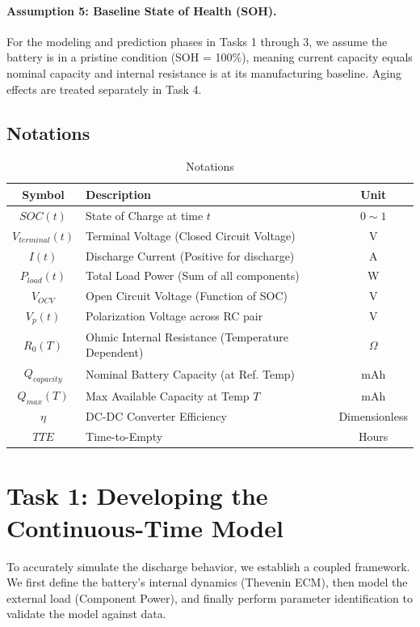 \documentclass{mcmthesis}
\newcommand{\Vterm}{V_{terminal}}
\newcommand{\Vocv}{V_{OCV}}
\newcommand{\Pload}{P_{load}}
\newcommand{\Vp}{V_{p}}
\newcommand{\Qcap}{Q_{capacity}}
\newcommand{\Qmax}{Q_{max}}
\begin{document}
\paragraph{Assumption 5: Baseline State of Health (SOH).} For the modeling and prediction phases in Tasks 1 through 3, we assume the battery is in a pristine condition (SOH = 100\%), meaning current capacity equals nominal capacity and internal resistance is at its manufacturing baseline. Aging effects are treated separately in Task 4.

\subsection{Notations}
\begin{table}[H]
\centering
\caption{Notations}
\begin{tabular}{clc}
\toprule
Symbol & Description & Unit \\
\midrule
$SOC(t)$ & State of Charge at time $t$ & $0 \sim 1$ \\
$\Vterm(t)$ & Terminal Voltage (Closed Circuit Voltage) & V \\
$I(t)$ & Discharge Current (Positive for discharge) & A \\
$\Pload(t)$ & Total Load Power (Sum of all components) & W \\
$\Vocv$ & Open Circuit Voltage (Function of SOC) & V \\
$\Vp(t)$ & Polarization Voltage across RC pair & V \\
$R_0(T)$ & Ohmic Internal Resistance (Temperature Dependent) & $\Omega$ \\
$\Qcap$ & Nominal Battery Capacity (at Ref. Temp) & mAh \\
$\Qmax(T)$ & Max Available Capacity at Temp $T$ & mAh \\
$\eta$ & DC-DC Converter Efficiency & Dimensionless \\
$TTE$ & Time-to-Empty & Hours \\
\bottomrule
\end{tabular}
\end{table}
\section{Task 1: Developing the Continuous-Time Model}

To accurately simulate the discharge behavior, we establish a coupled framework. We first define the battery's internal dynamics (Thevenin ECM), then model the external load (Component Power), and finally perform parameter identification to validate the model against data.
\end{document}
